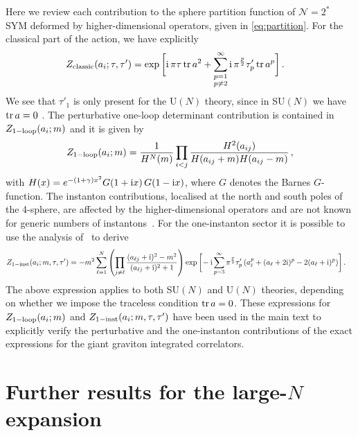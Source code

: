 \documentclass[aps,prl,twocolumn, longbibliography,footinbib,superscriptaddress, preprintnumbers]{revtex4-1}
\newcommand{\<}{\langle}
\renewcommand{\>}{\rangle}
\def\tr{{\rm tr}}
\begin{document}
{Here we review each contribution to the sphere partition function of $\mathcal{N}=2^*$ SYM deformed by higher-dimensional operators, given in \eqref{eq:partition}. For the classical part of the action, we have explicitly
\begin{align}
    Z_{\rm classic}(a_i; \tau, \tau') &=\exp \bigg[ {\rm i}\, \pi \tau \, \tr\, a^2 + \sum^\infty_{\substack{p=1 \\ p\neq 2}} {\rm i} \, \pi^{\frac{p}{2}} \tau'_p \, \tr\, a^p \bigg]\, .
    \end{align}
We see that $\tau'_1$ is only present for the U$(N)$ theory, since in SU$(N)$ we have $\tr\, a =0$ . The perturbative one-loop determinant contribution is contained in $Z_{\rm 1-loop}(a_i; m)$ and it is given by
    \begin{align}
 Z_{\rm 1-loop}(a_i; m) = \frac{1}{H^N(m)} \prod_{i<j} \frac{H^2(a_{ij})}{H(a_{ij}+m)H(a_{ij}-m)} \, ,
\end{align}
with $H(x)=e^{-(1+\gamma)x^2} G(1+{\rm i} x)\, G(1-{\rm i} x)$, where $G$ denotes the Barnes $G$-function.
The instanton contributions, localised at the north and south poles of the 4-sphere, are affected by the higher-dimensional operators and are not known for generic numbers of instantons~\cite{Gerchkovitz:2016gxx}. For the one-instanton sector it is possible to use the analysis of~\cite{Fucito:2015ofa} to derive
\begin{align}
& Z_{\rm 1-inst}(a_i; m, \tau, \tau') = -m^2 \sum_{\ell=1}^N \left( \prod_{j \neq \ell} \frac{(a_{\ell j} + {\rm i})^2 -m ^2}{(a_{\ell j} + {\rm i})^2 +1} \right)   \exp \bigg[\! -{\rm i} \sum_{p = 3}^\infty \pi^{\frac{p}{2}} \tau'_p\, (a_{\ell}^p +(a_{\ell} +2 {\rm i})^p -2(a_{\ell} + {\rm i})^p) \bigg] \, .
\end{align}
The above expression applies to both SU$(N)$ and U$(N)$ theories, depending on whether we impose the traceless condition $\tr\, a=0$.
These expressions for $ Z_{\rm 1-loop}(a_i; m) $ and $Z_{\rm 1-inst}(a_i; m, \tau, \tau')$ have been used in the main text to explicitly verify the perturbative and the one-instanton contributions of the exact expressions for the giant graviton integrated correlators.

\section{Further results for the large-$N$ expansion}
\label{sec:Hooft}

}
\end{document}
